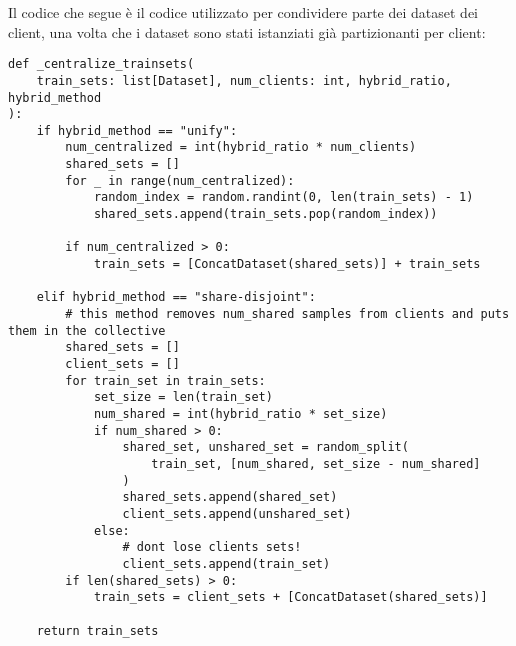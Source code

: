 Il codice che segue è il codice utilizzato per condividere parte dei 
dataset dei client, una volta che i dataset sono stati istanziati già
partizionanti per client:

\begin{lstlisting}
def _centralize_trainsets(
    train_sets: list[Dataset], num_clients: int, hybrid_ratio, hybrid_method
):
    if hybrid_method == "unify":
        num_centralized = int(hybrid_ratio * num_clients)
        shared_sets = []
        for _ in range(num_centralized):
            random_index = random.randint(0, len(train_sets) - 1)
            shared_sets.append(train_sets.pop(random_index))

        if num_centralized > 0:
            train_sets = [ConcatDataset(shared_sets)] + train_sets

    elif hybrid_method == "share-disjoint":
        # this method removes num_shared samples from clients and puts them in the collective
        shared_sets = []
        client_sets = []
        for train_set in train_sets:
            set_size = len(train_set)
            num_shared = int(hybrid_ratio * set_size)
            if num_shared > 0:
                shared_set, unshared_set = random_split(
                    train_set, [num_shared, set_size - num_shared]
                )
                shared_sets.append(shared_set)
                client_sets.append(unshared_set)
            else:
                # dont lose clients sets!
                client_sets.append(train_set)
        if len(shared_sets) > 0:
            train_sets = client_sets + [ConcatDataset(shared_sets)]

    return train_sets
\end{lstlisting}
